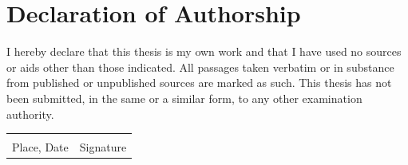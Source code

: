 \chapter*{Declaration of Authorship}

I hereby declare that this thesis is my own work and that I have used no
sources or aids other than those indicated. All passages taken verbatim
or in substance from published or unpublished sources are marked as such.
This thesis has not been submitted, in the same or a similar form, to any
other examination authority.

\vspace{2.5cm}

\noindent
\begin{tabular}{@{}p{6cm}p{6cm}@{}}
\hrulefill & \hrulefill \\
Place, Date & Signature \\
\end{tabular}
